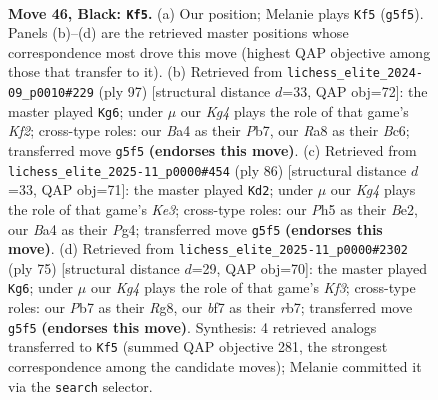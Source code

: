 \documentclass[11pt]{article}
\begin{document}
\clearpage

\begin{figure}[p]\centering
\begin{subfigure}{0.46\textwidth}\centering
\resizebox{\linewidth}{!}{%
\newchessgame
\chessboard[
  setfen={r7/1p3B2/p5R1/4P1kp/bP1r4/P6K/8/R7 b - - 6 46},
  showmover=false,
  pgfstyle=straightmove, color=movearrow, markmove={g5-f5}
]}
\caption{}
\end{subfigure}\hfill
\begin{subfigure}{0.46\textwidth}\centering
\resizebox{\linewidth}{!}{%
\newchessgame
\chessboard[
  setfen={3B4/1p2Rk2/p1b2p2/P7/2P2K2/1P3P2/8/7r b - - 28 49},
  showmover=false,
  pgfstyle=straightmove, color=movearrow, markmove={f7-g6}
]}
\caption{}
\end{subfigure}
\\[4pt]
\begin{subfigure}{0.46\textwidth}\centering
\resizebox{\linewidth}{!}{%
\newchessgame
\chessboard[
  setfen={6k1/R4p2/4p3/2p4P/2P1r1P1/4K3/P3B3/7b w - - 3 44},
  showmover=false,
  pgfstyle=straightmove, color=movearrow, markmove={e3-d2}
]}
\caption{}
\end{subfigure}\hfill
\begin{subfigure}{0.46\textwidth}\centering
\resizebox{\linewidth}{!}{%
\newchessgame
\chessboard[
  setfen={6r1/1R3Rp1/4pk2/3p3p/7P/2P3P1/r4P2/6K1 b - - 9 38},
  showmover=false,
  pgfstyle=straightmove, color=movearrow, markmove={f6-g6}
]}
\caption{}
\end{subfigure}
\caption{\textbf{Move 46, Black: \texttt{Kf5}.} (a) Our position; Melanie plays \texttt{Kf5} (\texttt{g5f5}). Panels (b)--(d) are the retrieved master positions whose correspondence most drove this move (highest QAP objective among those that transfer to it). (b) Retrieved from \texttt{lichess\_elite\_2024-09\_p0010\#229} (ply 97) [structural distance $d$=33, QAP obj=72]: the master played \texttt{Kg6}; under $\mu$ our \emph{Kg4} plays the role of that game's \emph{Kf2}; cross-type roles: our \emph{B}a4 as their \emph{P}b7, our \emph{R}a8 as their \emph{B}c6; transferred move \texttt{g5f5} \textbf{(endorses this move)}. (c) Retrieved from \texttt{lichess\_elite\_2025-11\_p0000\#454} (ply 86) [structural distance $d$=33, QAP obj=71]: the master played \texttt{Kd2}; under $\mu$ our \emph{Kg4} plays the role of that game's \emph{Ke3}; cross-type roles: our \emph{P}h5 as their \emph{B}e2, our \emph{B}a4 as their \emph{P}g4; transferred move \texttt{g5f5} \textbf{(endorses this move)}. (d) Retrieved from \texttt{lichess\_elite\_2025-11\_p0000\#2302} (ply 75) [structural distance $d$=29, QAP obj=70]: the master played \texttt{Kg6}; under $\mu$ our \emph{Kg4} plays the role of that game's \emph{Kf3}; cross-type roles: our \emph{P}b7 as their \emph{R}g8, our \emph{b}f7 as their \emph{r}b7; transferred move \texttt{g5f5} \textbf{(endorses this move)}. Synthesis: 4 retrieved analogs transferred to \texttt{Kf5} (summed QAP objective 281, the strongest correspondence among the candidate moves); Melanie committed it via the \texttt{search} selector.}
\label{fig:thought-m91}
\end{figure}
\end{document}
